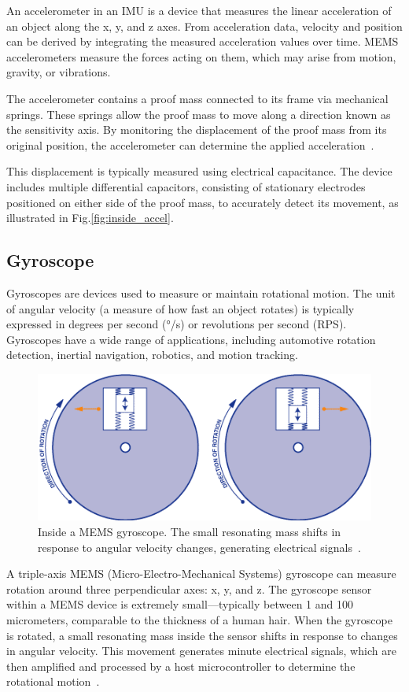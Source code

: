 \documentclass[english, bachelor, utf8]{base/thesis_telematics}
\begin{document}
An accelerometer in an IMU is a device that measures the linear acceleration of an object along the x, y, and z axes. From acceleration data, velocity and position can be derived by integrating the measured acceleration values over time. MEMS accelerometers measure the forces acting on them, which may arise from motion, gravity, or vibrations.

The accelerometer contains a proof mass connected to its frame via mechanical springs. These springs allow the proof mass to move along a direction known as the sensitivity axis. By monitoring the displacement of the proof mass from its original position, the accelerometer can determine the applied acceleration~\cite{ericco_mems_accel_vibrations}.

This displacement is typically measured using electrical capacitance. The device includes multiple differential capacitors, consisting of stationary electrodes positioned on either side of the proof mass, to accurately detect its movement, as illustrated in Fig.\ref{fig:inside_accel}.

\subsection{Gyroscope}

Gyroscopes are devices used to measure or maintain rotational motion.
The unit of angular velocity (a measure of how fast an object rotates) is typically expressed in degrees per second (°/s) or revolutions per second (RPS). 
Gyroscopes have a wide range of applications, including automotive rotation detection, inertial navigation, robotics, and motion tracking.

\begin{figure}[ht]
\centering
\includegraphics[width=0.7\columnwidth]{pics/inside_gyro.png}
\caption{Inside a MEMS gyroscope. The small resonating mass shifts in response to angular velocity changes, generating electrical signals~\cite{sparkfun_gyroscope}.}
\label{fig:inside_gyro}
\end{figure}

A triple-axis MEMS (Micro-Electro-Mechanical Systems) gyroscope can measure rotation around three perpendicular axes: x, y, and z. The gyroscope sensor within a MEMS device is extremely small—typically between 1 and 100 micrometers, comparable to the thickness of a human hair. 
When the gyroscope is rotated, a small resonating mass inside the sensor shifts in response to changes in angular velocity. 
This movement generates minute electrical signals, which are then amplified and processed by a host microcontroller to determine the rotational motion~\cite{sparkfun_gyroscope,Pedestrian}.
\end{document}
